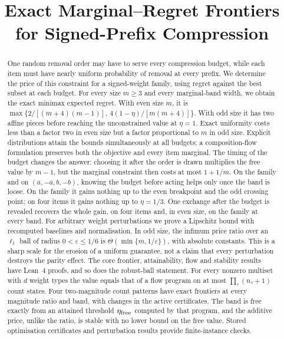 \documentclass[conference]{IEEEtran}
\theoremstyle{definition}
\begin{document}
\title{Exact Marginal--Regret Frontiers\\for Signed-Prefix Compression}

\author{
}

\maketitle

\begin{abstract}
One random removal order may have to serve every compression budget, while each item must
have nearly uniform probability of removal at every prefix. We determine the price of this
constraint for a signed-weight family, using regret against the best subset at each budget.
For every size $m\ge3$ and every marginal-band width, we obtain the exact minimax expected regret.
With even size $m$, it is
$\max\{2/[(m+4)(m-1)],\,4(1-\eta)/[m(m+4)]\}$.
With odd size it has two affine pieces before reaching the unconstrained value at $\eta=1$.
Exact uniformity costs less than a factor two in even size but a factor proportional to $m$
in odd size. Explicit distributions attain the bounds simultaneously at all budgets; a
composition-flow formulation preserves both the objective and every item marginal.
The timing of the budget changes the answer: choosing it after the order is drawn
multiplies the free value by $m-1$, but the marginal constraint then costs at most $1+1/m$.
On the family and on $(a,-a,b,-b)$, knowing the budget before acting helps only once the band
is loose. On the family it gains
nothing up to the even breakpoint and the odd crossing point; on four items it gains nothing up
to $\eta=1/3$. One exchange after the budget is revealed recovers the whole gain, on four items
and, in even size, on the family at every band.
For arbitrary weight perturbations we prove a Lipschitz bound with recomputed baselines and
normalisation. In odd size, the infimum price ratio over an $\ell_1$ ball of radius
$0<\varepsilon\le1/6$ is $\Theta(\min\{m,1/\varepsilon\})$, with absolute constants.
This is a sharp scale for the erosion of a uniform guarantee, not a claim that every
perturbation destroys the parity effect. The core frontier, attainability, flow and stability
results have Lean~4 proofs, and so does the robust-ball statement.
For every nonzero multiset with $d$ weight types the value equals that of a flow program
on at most $\prod_\tau(n_\tau+1)$ count states. Four two-magnitude count patterns have exact
frontiers at every magnitude ratio and band, with changes in the active certificates. The band is free exactly from an attained threshold
$\eta_{\rm free}$ computed by that program, and the additive price, unlike the ratio, is stable
with no lower bound on the free value.
Stored optimisation certificates and perturbation results provide finite-instance checks.
\end{abstract}
\end{document}
